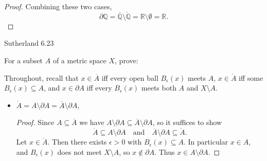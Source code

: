 \documentclass[minion]{homework}
\newcommand{\Reals}{\ensuremath{\mathbb R}}%
\newcommand{\Rats}{\ensuremath{\mathbb Q}} %
\begin{document}
\begin{problems}
\begin{proof}
  Combining these two cases,
  $$\partial\Rats = \overline{\Rats} \setminus \mathring{\Rats} = \Reals \setminus \emptyset = \Reals.$$
\end{proof}
\problem Sutherland 6.23

For a subset $A$ of a metric space $X$, prove:

Throughout, recall that $x \in \overline{A}$ iff every open ball $B_\epsilon(x)$ meets $A$, $x \in \mathring{A}$ iff some $B_\epsilon(x) \subseteq A$, and $x \in \partial A$ iff every $B_\epsilon(x)$ meets both $A$ and $X \setminus A$.
\begin{itemize}
  \item[(a)] $\mathring{A} = A \setminus \partial A = \overline{A} \setminus \partial A$, \newline
    \begin{proof}
      Since $A \subseteq \overline{A}$ we have $A \setminus \partial A \subseteq \overline{A} \setminus \partial A$, so it suffices to show
      $$\mathring{A} \subseteq A \setminus \partial A \quad \text{and} \quad \overline{A} \setminus \partial A \subseteq \mathring{A}.$$
      Let $x \in \mathring{A}$. Then there exists $\epsilon > 0$ with $B_\epsilon(x) \subseteq A$. In particular $x \in A$, and $B_\epsilon(x)$ does not meet $X \setminus A$, so $x \notin \partial A$. Thus $x \in A \setminus \partial A$.


\end{proof}
\end{itemize}
\end{problems}
\end{document}
